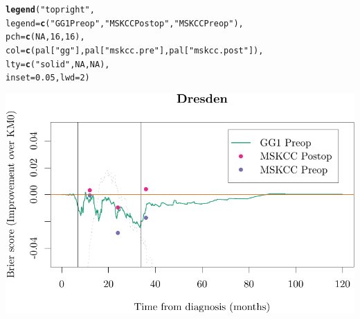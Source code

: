 \documentclass{article}\usepackage[]{graphicx}\usepackage[]{color}
\makeatletter
\def\maxwidth{ %
  \ifdim\Gin@nat@width>\linewidth
    \linewidth
  \else
    \Gin@nat@width
  \fi
}
\newcommand{\hlnum}[1]{\textcolor[rgb]{0.686,0.059,0.569}{#1}}%
\newcommand{\hlstr}[1]{\textcolor[rgb]{0.192,0.494,0.8}{#1}}%
\newcommand{\hlstd}[1]{\textcolor[rgb]{0.345,0.345,0.345}{#1}}%
\newcommand{\hlkwc}[1]{\textcolor[rgb]{0.333,0.667,0.333}{#1}}%
\newcommand{\hlkwd}[1]{\textcolor[rgb]{0.737,0.353,0.396}{\textbf{#1}}}%
\newenvironment{kframe}{%
 \def\at@end@of@kframe{}%
 \ifinner\ifhmode%
  \def\at@end@of@kframe{\end{minipage}}%
  \begin{minipage}{\columnwidth}%
 \fi\fi%
 \def\FrameCommand##1{\hskip\@totalleftmargin \hskip-\fboxsep
 \colorbox{shadecolor}{##1}\hskip-\fboxsep
     \hskip-\linewidth \hskip-\@totalleftmargin \hskip\columnwidth}%
 \MakeFramed {\advance\hsize-\width
   \@totalleftmargin\z@ \linewidth\hsize
   \@setminipage}}%
 {\par\unskip\endMakeFramed%
 \at@end@of@kframe}
\newenvironment{knitrout}{}{} %
\makeatother
\begin{document}
\begin{knitrout}
\begin{kframe}
\begin{alltt}
\hlkwd{legend}\hlstd{(}\hlstr{"topright"}\hlstd{,}
        \hlkwc{legend} \hlstd{=} \hlkwd{c}\hlstd{(}     \hlstr{"GG1 Preop"}\hlstd{,}    \hlstr{"MSKCC Postop"}\hlstd{,}         \hlstr{"MSKCC Preop"}\hlstd{),}
        \hlkwc{pch} \hlstd{=} \hlkwd{c}\hlstd{(}        \hlnum{NA}\hlstd{,}                     \hlnum{16}\hlstd{,}                             \hlnum{16}\hlstd{),}
        \hlkwc{col} \hlstd{=} \hlkwd{c}\hlstd{(        pal[}\hlstr{"gg"}\hlstd{],              pal[}\hlstr{"mskcc.pre"}\hlstd{],       pal[}\hlstr{"mskcc.post"}\hlstd{]),}
        \hlkwc{lty} \hlstd{=} \hlkwd{c}\hlstd{(}        \hlstr{"solid"}\hlstd{,}                \hlnum{NA}\hlstd{,}                             \hlnum{NA}\hlstd{),}
        \hlkwc{inset} \hlstd{=} \hlnum{0.05}\hlstd{,} \hlkwc{lwd} \hlstd{=} \hlnum{2}\hlstd{)}
\end{alltt}
\end{kframe}

{\centering \includegraphics[width=\maxwidth]{figure/07-prob-bs-paths-plot-dresden-3} 

}



\end{knitrout}
\end{document}
